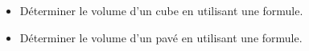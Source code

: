 \begin{changemargin}{0mm}{-10mm}
    \begin{prerequis}
        \begin{itemize}        
            \item[\emoji{diamond-suit}] Déterminer le volume d’un cube en utilisant une formule.
            \item[\emoji{diamond-suit}] Déterminer le volume d’un pavé en utilisant une formule.
        \end{itemize}
    \end{prerequis}
\end{changemargin}
